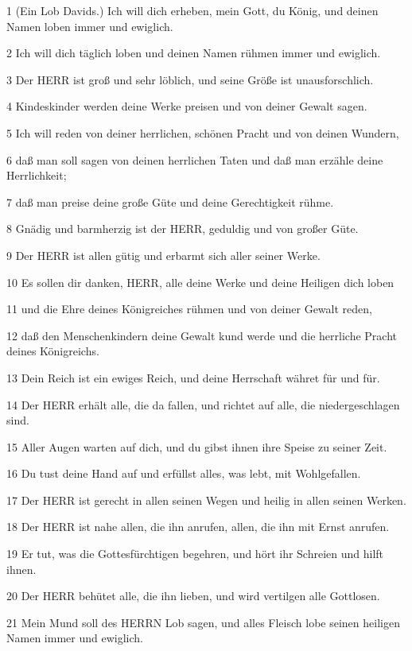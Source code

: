 \par 1 (Ein Lob Davids.) Ich will dich erheben, mein Gott, du König, und deinen Namen loben immer und ewiglich.
\par 2 Ich will dich täglich loben und deinen Namen rühmen immer und ewiglich.
\par 3 Der HERR ist groß und sehr löblich, und seine Größe ist unausforschlich.
\par 4 Kindeskinder werden deine Werke preisen und von deiner Gewalt sagen.
\par 5 Ich will reden von deiner herrlichen, schönen Pracht und von deinen Wundern,
\par 6 daß man soll sagen von deinen herrlichen Taten und daß man erzähle deine Herrlichkeit;
\par 7 daß man preise deine große Güte und deine Gerechtigkeit rühme.
\par 8 Gnädig und barmherzig ist der HERR, geduldig und von großer Güte.
\par 9 Der HERR ist allen gütig und erbarmt sich aller seiner Werke.
\par 10 Es sollen dir danken, HERR, alle deine Werke und deine Heiligen dich loben
\par 11 und die Ehre deines Königreiches rühmen und von deiner Gewalt reden,
\par 12 daß den Menschenkindern deine Gewalt kund werde und die herrliche Pracht deines Königreichs.
\par 13 Dein Reich ist ein ewiges Reich, und deine Herrschaft währet für und für.
\par 14 Der HERR erhält alle, die da fallen, und richtet auf alle, die niedergeschlagen sind.
\par 15 Aller Augen warten auf dich, und du gibst ihnen ihre Speise zu seiner Zeit.
\par 16 Du tust deine Hand auf und erfüllst alles, was lebt, mit Wohlgefallen.
\par 17 Der HERR ist gerecht in allen seinen Wegen und heilig in allen seinen Werken.
\par 18 Der HERR ist nahe allen, die ihn anrufen, allen, die ihn mit Ernst anrufen.
\par 19 Er tut, was die Gottesfürchtigen begehren, und hört ihr Schreien und hilft ihnen.
\par 20 Der HERR behütet alle, die ihn lieben, und wird vertilgen alle Gottlosen.
\par 21 Mein Mund soll des HERRN Lob sagen, und alles Fleisch lobe seinen heiligen Namen immer und ewiglich.

